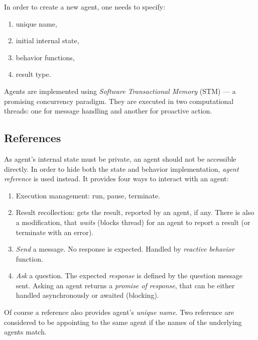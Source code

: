 \documentclass[../header]{subfiles}
\begin{document}
\medskip

\noindent
In order to create a new agent, one needs to specify: \\
\begin{enumerate}
  \item unique name,
  \item initial internal state,
  \item behavior functions,
  \item result type.
\end{enumerate}

\bigskip

\noindent
Agents are implemented using \emph{Software Transactional Memory} (STM)
\cite{STMCode07} --- a promising concurrency paradigm.
They are executed in two computational threads:
one for message handling and another for proactive action.

\subsection{References}
As agent's internal state must be private, an agent should not be accessible directly.
In order to hide both the state and behavior implementation, \emph{agent reference}
is used instead. It provides four ways to interact with an agent:
\begin{enumerate}
  \item Execution management: run, pause, terminate.
  \item Result recollection: gets the result, reported by an agent, if any.
        There is also a modification, that \emph{waits} (blocks thread) for an agent
        to report a result (or terminate with an error).
  \item \emph{Send} a message. No response is expected. Handled by
        \emph{reactive behavior} function.
  \item \emph{Ask} a question. The expected \emph{response} is defined by
        the question message sent. Asking an agent returns a \emph{promise of response},
        that can be either handled asynchronously or awaited (blocking).
\end{enumerate}

Of course a reference also provides agent's \emph{unique name}. Two
reference are considered to be appointing to the same agent if the names
of the underlying agents match.


\end{document}
